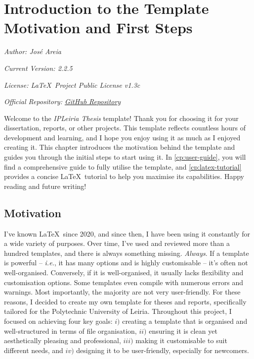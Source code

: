 \chapter[Introduction to the Template: Motivation and First Steps]{Introduction to the Template Motivation and First Steps}
\label{cp:introduction}

{
\parindent0pt

\textit{Author: José Areia}

\textit{Current Version: 2.2.5}

\textit{License: \LaTeX~Project Public License v1.3c}

\textit{Official Repository: \href{https://github.com/joseareia/ipleiria-thesis}{GitHub Repository}}

\vspace{.935em}

Welcome to the \textcolor{maincolor}{\textit{IPLeiria Thesis}} template! Thank you for choosing it for your dissertation, reports, or other projects. This template reflects countless hours of development and learning, and I hope you enjoy using it as much as I enjoyed creating it. This chapter introduces the motivation behind the template and guides you through the initial steps to start using it. In \autoref{cp:user-guide}, you will find a comprehensive guide to fully utilise the template, and \autoref{cp:latex-tutorial} provides a concise \LaTeX~tutorial to help you maximise its capabilities. Happy reading and future writing!

\section{Motivation}
I've known \LaTeX~since 2020, and since then, I have been using it constantly for a wide variety of purposes. Over time, I’ve used and reviewed more than a hundred templates, and there is always something missing. \textit{Always}. If a template is powerful -- \textit{i.e.}, it has many options and is highly customisable -- it’s often not well-organised. Conversely, if it is well-organised, it usually lacks flexibility and customisation options. Some templates even compile with numerous errors and warnings. Most importantly, the majority are not very user-friendly. For these reasons, I decided to create my own template for theses and reports, specifically tailored for the Polytechnic University of Leiria. Throughout this project, I focused on achieving four key goals: \(i)\) creating a template that is organised and well-structured in terms of file organisation, \(ii)\) ensuring it is clean yet aesthetically pleasing and professional, \(iii)\) making it customisable to suit different needs, and \(iv)\) designing it to be user-friendly, especially for newcomers.

}
